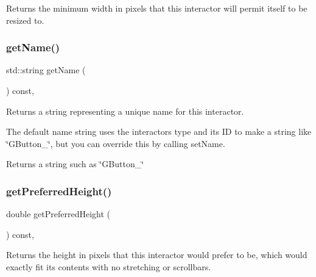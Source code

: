 Returns the minimum width in pixels that this interactor will permit itself to be resized to. 

\mbox{\label{classGInteractor_a8a60438a5b55d0b2ceb35c8674b9d8c5}} 
\subsubsection{\texorpdfstring{get\+Name()}{getName()}}
{\footnotesize\ttfamily std\+::string get\+Name (\begin{DoxyParamCaption}{ }\end{DoxyParamCaption}) const\hspace{0.3cm}{\ttfamily [virtual]}, {\ttfamily [inherited]}}



Returns a string representing a unique name for this interactor. 

The default name string uses the interactor\textquotesingle{}s type and its ID to make a string like \char`\"{}\+G\+Button\+\_\char`\"{}, but you can override this by calling set\+Name. \begin{DoxyReturn}{Returns}
a string such as \char`\"{}\+G\+Button\+\_\char`\"{} 
\end{DoxyReturn}
\mbox{\label{classGInteractor_a747de0961653847bdc6615dbf756d715}} 
\subsubsection{\texorpdfstring{get\+Preferred\+Height()}{getPreferredHeight()}}
{\footnotesize\ttfamily double get\+Preferred\+Height (\begin{DoxyParamCaption}{ }\end{DoxyParamCaption}) const\hspace{0.3cm}{\ttfamily [virtual]}, {\ttfamily [inherited]}}



Returns the height in pixels that this interactor would prefer to be, which would exactly fit its contents with no stretching or scrollbars. 

\mbox{\label{classGInteractor_a4aabbee761d8e9116275401131b7ccd1}} 
